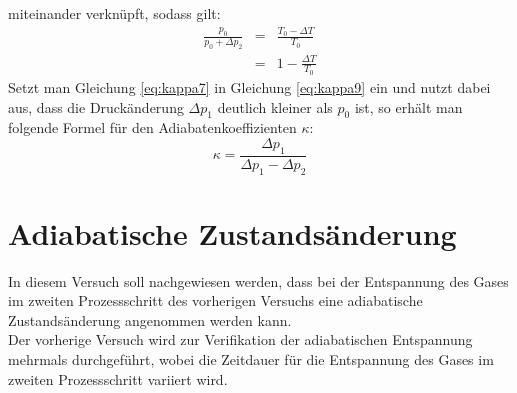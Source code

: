 \documentclass[a4paper,titlepage]{scrartcl}
\numberwithin{equation}{section}
\begin{document}
miteinander verknüpft, sodass gilt:
\begin{eqnarray}
\frac{p_0}{p_0+\Delta p_2}&=&\frac{T_0 - \Delta T}{T_0}\label{eq:kappa8}\\
&=&1-\frac{\Delta T}{T_0}\label{eq:kappa9}
\end{eqnarray}
Setzt man Gleichung \ref{eq:kappa7} in Gleichung \ref{eq:kappa9} ein  und nutzt dabei aus, dass die Druckänderung $\Delta p_1$ deutlich kleiner als $p_0$ ist, so erhält man folgende Formel für den Adiabatenkoeffizienten $\kappa$:
\begin{equation*}
\kappa=\frac{\Delta p_1}{\Delta p_1 - \Delta p_2}
\end{equation*}
\section{Adiabatische Zustandsänderung}
In diesem Versuch soll nachgewiesen werden, dass bei der Entspannung des Gases im zweiten Prozessschritt des vorherigen Versuchs eine adiabatische Zustandsänderung angenommen werden kann.\\
Der vorherige Versuch wird zur Verifikation der adiabatischen Entspannung mehrmals durchgeführt, wobei die Zeitdauer für die Entspannung des Gases im zweiten Prozessschritt variiert wird.
\end{document}

